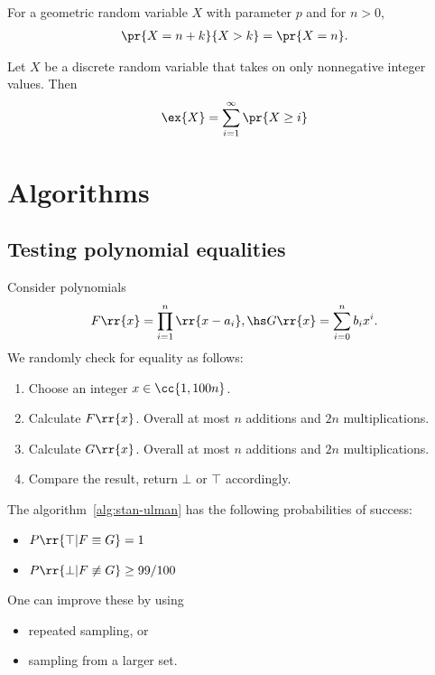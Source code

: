 \documentclass{article}
\begin{document}
\begin{lemma}
  For a geometric random variable $X$ with parameter $p$ and for $n>0$,
  \begin{align*}
    \pr{X=n+k}{X>k} = \pr{X=n}.
  \end{align*}
\end{lemma}

\begin{lemma}
  Let $X$ be a discrete random variable that takes on only nonnegative integer values. Then
  \begin{align*}
    \ex{X} = \sum_{i=1}^{\infty} \pr{X\geq i}
  \end{align*}
\end{lemma}

\section{Algorithms}
\label{sec:algorithms}

\subsection{Testing polynomial equalities}

\begin{algorithm}
  \label{alg:stan-ulam}
  Consider polynomials
  \begin{align*}
    F \rr{ x } = \prod_{i=1}^n \rr{ x - a_i }, \hs G \rr{ x } = \sum_{ i=0 }^{ n } b_i x^i.
  \end{align*}
  We randomly check for equality as follows:
  \begin{enumerate}
    \item Choose an integer $x\in \cc{ 1, 100n }$.
    \item Calculate $F \rr{ x }$. Overall at most $n$ additions and $2n$ multiplications.
    \item Calculate $G \rr{ x }$. Overall at most $n$ additions and $2n$ multiplications.
    \item Compare the result, return $\bot$ or $\top$ accordingly.
  \end{enumerate}
\end{algorithm}


\begin{theorem}
  \label{thm:stan-ulman-probabilities}
  The algorithm~\ref{alg:stan-ulman} has the following probabilities of success:
  \begin{itemize}
    \item $P \rr{ \top | F\equiv G } = 1$
    \item $P \rr{ \bot | F\not\equiv G } \geq 99/100$
  \end{itemize}
  One can improve these by using
  \begin{itemize}
    \item repeated sampling, or
    \item sampling from a larger set.
  \end{itemize}
\end{theorem}
\end{document}
